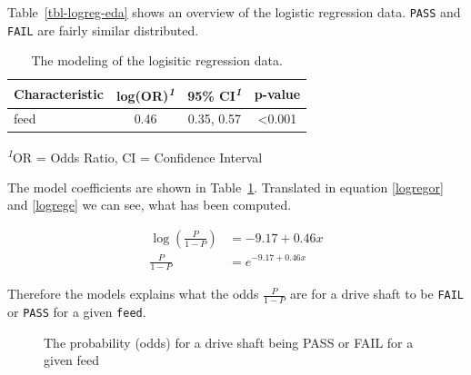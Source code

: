\documentclass[
  a4paper,
]{scrbook}
\begin{document}
Table~\ref{tbl-logreg-eda} shows an overview of the logistic regression
data. \texttt{PASS} and \texttt{FAIL} are fairly similar distributed.

\begingroup
\fontsize{12.0pt}{14.4pt}\selectfont
\setlength{\LTpost}{0mm}

\begin{longtable}{lccc}

\caption{\label{tbl-logreg-mdl}The modeling of the logisitic regression
data.}

\tabularnewline

\toprule
\textbf{Characteristic} & \textbf{log(OR)}\textsuperscript{\textit{1}} & \textbf{95\% CI}\textsuperscript{\textit{1}} & \textbf{p-value} \\ 
\midrule\addlinespace[2.5pt]
feed & 0.46 & 0.35, 0.57 & <0.001 \\ 
\bottomrule

\end{longtable}

\begin{minipage}{\linewidth}
\textsuperscript{\textit{1}}OR = Odds Ratio, CI = Confidence Interval\\
\end{minipage}
\endgroup

The model coefficients are shown in Table~\ref{tbl-logreg-mdl}.
Translated in equation \eqref{logregor} and \eqref{logrege} we can see,
what has been computed.

\begin{align}
\log(\frac{P}{1-P}) &= -9.17 + 0.46x \label{logregor} \\
\frac{P}{1-P} &= e^{-9.17 + 0.46x} \label{logrege}
\end{align}

Therefore the models explains what the odds \(\frac{P}{1-P}\) are for a
drive shaft to be \texttt{FAIL} or \texttt{PASS} for a given
\texttt{feed}.

\begin{figure}[H]


\caption{\label{fig-logreg-mdl}The probability (odds) for a drive shaft
being PASS or FAIL for a given feed}

\end{figure}%
\end{document}
